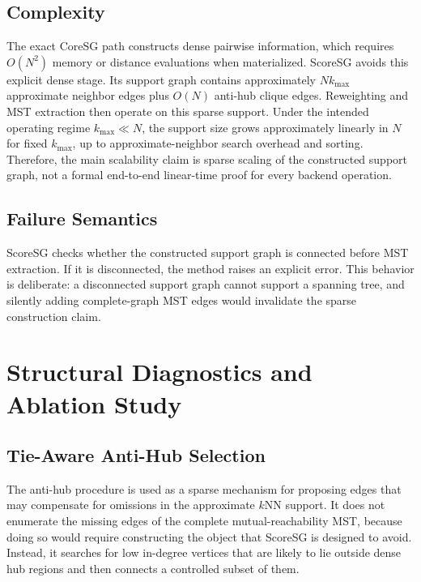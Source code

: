 \documentclass[11pt]{article}
\begin{document}
\subsection{Complexity}

The exact CoreSG path constructs dense pairwise information, which requires \(O(N^2)\) memory or distance evaluations when materialized. ScoreSG avoids this explicit dense stage. Its support graph contains approximately \(Nk_{\max}\) approximate neighbor edges plus \(O(N)\) anti-hub clique edges. Reweighting and MST extraction then operate on this sparse support. Under the intended operating regime \(k_{\max} \ll N\), the support size grows approximately linearly in \(N\) for fixed \(k_{\max}\), up to approximate-neighbor search overhead and sorting. Therefore, the main scalability claim is sparse scaling of the constructed support graph, not a formal end-to-end linear-time proof for every backend operation.

\subsection{Failure Semantics}

ScoreSG checks whether the constructed support graph is connected before MST extraction. If it is disconnected, the method raises an explicit error. This behavior is deliberate: a disconnected support graph cannot support a spanning tree, and silently adding complete-graph MST edges would invalidate the sparse construction claim.

\section{Structural Diagnostics and Ablation Study}
\label{sec:diagnostics}

\subsection{Tie-Aware Anti-Hub Selection}
\label{sec:tie-aware-missing-edge}

The anti-hub procedure is used as a sparse mechanism for proposing edges that may compensate for omissions in the approximate \(k\)NN support. It does not enumerate the missing edges of the complete mutual-reachability MST, because doing so would require constructing the object that ScoreSG is designed to avoid. Instead, it searches for low in-degree vertices that are likely to lie outside dense hub regions and then connects a controlled subset of them.
\end{document}
